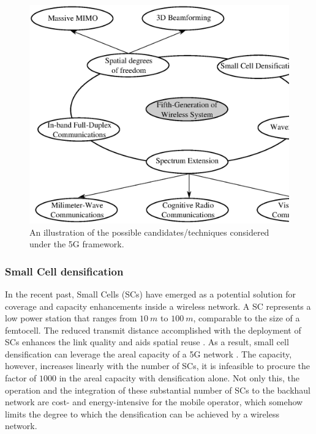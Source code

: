 \begin{figure}
\centering
\includegraphics[width = 0.98 \columnwidth]{figures/5G}
\caption{An illustration of the possible candidates/techniques considered under the 5G framework.}
\label{fig:5G}
\end{figure}


\subsubsection*{Small Cell densification}

In the recent past, Small Cells (SCs) have emerged as a potential solution for coverage and capacity enhancements inside a wireless network. A SC represents a low power station that ranges from $\SI{10}{m}$ to $\SI{100}{m}$, comparable to the size of a femtocell. The reduced transmit distance accomplished with the deployment of SCs enhances the link quality and aids spatial reuse \cite{Chander08}.
As a result, small cell densification can leverage the areal capacity of a 5G network \cite{Andrews14}. The capacity, however, increases linearly with the number of SCs, it is infeasible to procure the factor of $1000$ in the areal capacity with densification alone. Not only this, the operation and the integration of these substantial number of SCs to the backhaul network are cost- and energy-intensive for the mobile operator, which somehow limits the degree to which the densification can be achieved by a wireless network.





